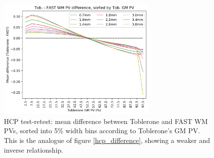\documentclass[12pt]{report}
\providecommand{\DIFdelbegin}{} %
\newcommand{\DIFscaledelfig}{0.5}
\newlength{\DIFdelgraphicswidth} %
\newlength{\DIFdelgraphicsheight} %
\newcommand{\DIFdelincludegraphics}[2][]{%
\sbox{\DIFdelgraphicsbox}{\DIFOincludegraphics[#1]{#2}}%
\settoboxwidth{\DIFdelgraphicswidth}{\DIFdelgraphicsbox} %
\settoboxtotalheight{\DIFdelgraphicsheight}{\DIFdelgraphicsbox} %
\scalebox{\DIFscaledelfig}{%
\parbox[b]{\DIFdelgraphicswidth}{\usebox{\DIFdelgraphicsbox}\\[-\baselineskip] \rule{\DIFdelgraphicswidth}{0em}}\llap{\resizebox{\DIFdelgraphicswidth}{\DIFdelgraphicsheight}{%
\setlength{\unitlength}{\DIFdelgraphicswidth}%
\begin{picture}(1,1)%
\thicklines\linethickness{2pt} %
{\color[rgb]{1,0,0}\put(0,0){\framebox(1,1){}}}%
{\color[rgb]{1,0,0}\put(0,0){\line( 1,1){1}}}%
{\color[rgb]{1,0,0}\put(0,1){\line(1,-1){1}}}%
\end{picture}%
}\hspace*{3pt}}} %
} %
\DeclareRobustCommand{\DIFdelbegin}{\DIFOdelbegin \let\includegraphics\DIFdelincludegraphics} %
\begin{document}
\begin{appendices}
\begin{figure}
\centering
\includegraphics[width = 0.7\textwidth]{hcp_difference_wm_supp.png}
\caption{HCP test-retest: mean difference between Toblerone and FAST WM PVs, sorted into 5\% width bins according to Toblerone’s GM PV. This is the analogue of figure \ref{hcp_difference}, showing a weaker and inverse relationship.}
\label{hcp_difference_wm_supp}
\end{figure}

\end{appendices} \newpage 

\DIFdelbegin %
\end{document}
